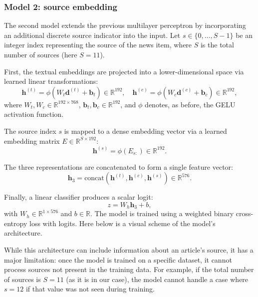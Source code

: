 \documentclass[a4paper,twoside,12pt]{book}
\begin{document}
\subsubsection*{Model 2: source embedding}

The second model extends the previous multilayer perceptron by incorporating an additional discrete source indicator into the input. Let $s \in \{0, \dots, S-1\}$ be an integer index representing the source of the news item, where $S$ is the total number of sources (here $S = 11$).

First, the textual embeddings are projected into a lower-dimensional space via learned linear transformations:
\[
\mathbf{h}^{(t)} = \phi\left(W_t \mathbf{d}^{(t)} + \mathbf{b}_t \right) \in \mathbb{R}^{192}, \quad
\mathbf{h}^{(c)} = \phi\left(W_c \mathbf{d}^{(c)} + \mathbf{b}_c \right) \in \mathbb{R}^{192},
\]
where $W_t, W_c \in \mathbb{R}^{192\times 768}$, $\mathbf{b}_t, \mathbf{b}_c \in \mathbb{R}^{192}$, and $\phi$ denotes, as before, the GELU activation function.

The source index $s$ is mapped to a dense embedding vector via a learned embedding matrix $E \in \mathbb{R}^{S\times 192}$:
\[
\mathbf{h}^{(s)} = \phi\left(E_{s:}\right) \in \mathbb{R}^{192}.
\]

The three representations are concatenated to form a single feature vector:
\[
\mathbf{h}_3 = \text{concat}(\mathbf{h}^{(t)}, \mathbf{h}^{(c)}, \mathbf{h}^{(s)}) \in \mathbb{R}^{576}.
\]

Finally, a linear classifier produces a scalar logit:
\[
z = W_h \mathbf{h}_3 + b,
\]
with $W_h \in \mathbb{R}^{1 \times 576}$ and $b \in \mathbb{R}$. The model is trained using a weighted binary cross-entropy loss with logits. Here below is a visual scheme of the model's architecture.

While this architecture can include information about an article’s source, it has a major limitation: once the model is trained on a specific dataset, it cannot process sources not present in the training data. For example, if the total number of sources is $S = 11$ (as it is in our case), the model cannot handle a case where $s = 12$ if that value was not seen during training. 

\vspace{1em}
\end{document}
